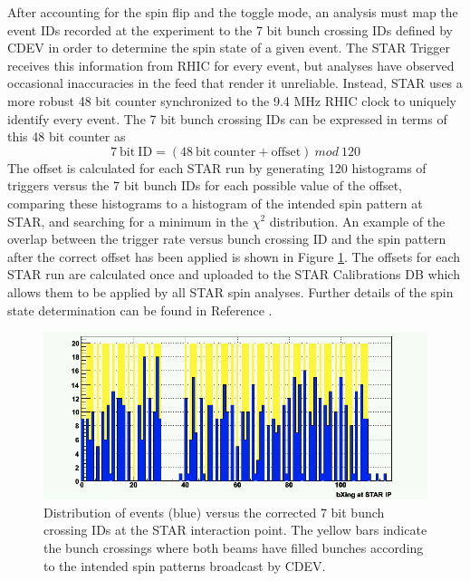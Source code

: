 After accounting for the spin flip and the toggle mode, an analysis must map the event IDs recorded at the experiment to the 7 bit bunch crossing IDs defined by CDEV in order to determine the spin state of a given event.  The STAR Trigger receives this information from RHIC for every event, but analyses have observed occasional inaccuracies in the feed that render it unreliable.  Instead, STAR uses a more robust 48 bit counter synchronized to the 9.4 MHz RHIC clock to uniquely identify every event.  The 7 bit bunch crossing IDs can be expressed in terms of this 48 bit counter as
%
\begin{equation}
  \mathrm{7~bit~ID} = \left(\mathrm{48~bit~counter} + \mathrm{offset}\right)~mod~120
\end{equation}
%
The offset is calculated for each STAR run by generating 120 histograms of triggers versus the 7 bit bunch IDs for each possible value of the offset, comparing these histograms to a histogram of the intended spin pattern at STAR, and searching for a minimum in the $\chi^2$ distribution.  An example of the overlap between the trigger rate versus bunch crossing ID and the spin pattern after the correct offset has been applied is shown in Figure \ref{fig:bxing-offset}.  The offsets for each STAR run are calculated once and uploaded to the STAR Calibrations DB which allows them to be applied by all STAR spin analyses.  Further details of the spin state determination can be found in Reference \cite{spin-db-website}.

\begin{figure}
  \includegraphics[width=1.0\textwidth]{figures/bxing-offset-determined}
  \caption{Distribution of events (blue) versus the corrected 7 bit bunch crossing IDs at the STAR interaction point.  The yellow bars indicate the bunch crossings where both beams have filled bunches according to the intended spin patterns broadcast by CDEV.}
  \label{fig:bxing-offset}
\end{figure}
